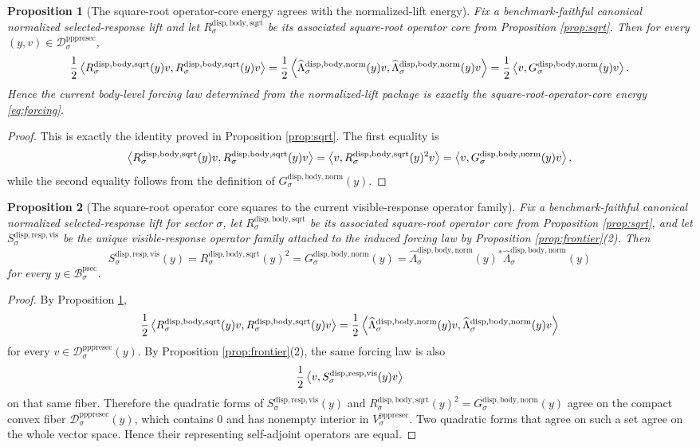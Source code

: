 \documentclass[11pt]{article}
\newcommand{\ProtoSectionBody}[1]{\mathcal B_{#1}^{\mathrm{psec}}}
\newcommand{\PrePreProtoSectionVertical}[1]{V_{#1}^{\mathrm{pppresec}}}
\newcommand{\PrePreProtoSectionResidualBody}[1]{\mathcal D_{#1}^{\mathrm{pppresec}}}
\newcommand{\VisibleResponseOperator}[1]{S_{#1}^{\mathrm{disp,resp,vis}}}
\newcommand{\NormalizedSelectedResponseLift}[1]{\widehat{\Lambda}_{#1}^{\mathrm{disp,body,norm}}}
\newcommand{\SquareRootOperator}[1]{R_{#1}^{\mathrm{disp,body,sqrt}}}
\newcommand{\GramOperator}[1]{G_{#1}^{\mathrm{disp,body,norm}}}
\newtheorem{proposition}{Proposition}
\begin{document}
\begin{proposition}[The square-root operator-core energy agrees with the normalized-lift energy]
\label{prop:energy}
Fix a benchmark-faithful canonical normalized selected-response lift and let \(\SquareRootOperator{\sigma}\) be its associated square-root operator core from Proposition \ref{prop:sqrt}. Then for every \((y,v)\in\PrePreProtoSectionResidualBody{\sigma}\),
\[
\frac{1}{2}
\ev{
\SquareRootOperator{\sigma}(y)v,
\SquareRootOperator{\sigma}(y)v
}
=
\frac{1}{2}
\ev{
\NormalizedSelectedResponseLift{\sigma}(y)v,
\NormalizedSelectedResponseLift{\sigma}(y)v
}
=
\frac{1}{2}
\ev{
v,\GramOperator{\sigma}(y)v
}.
\]
Hence the current body-level forcing law determined from the normalized-lift package is exactly the square-root-operator-core energy \eqref{eq:forcing}.
\end{proposition}

\begin{proof}
This is exactly the identity proved in Proposition \ref{prop:sqrt}. The first equality is
\[
\ev{
\SquareRootOperator{\sigma}(y)v,
\SquareRootOperator{\sigma}(y)v
}
=
\ev{
v,\SquareRootOperator{\sigma}(y)^2v
}
=
\ev{
v,\GramOperator{\sigma}(y)v
},
\]
while the second equality follows from the definition of \(\GramOperator{\sigma}(y)\).
\end{proof}

\begin{proposition}[The square-root operator core squares to the current visible-response operator family]
\label{prop:visible}
Fix a benchmark-faithful canonical normalized selected-response lift for sector \(\sigma\), let \(\SquareRootOperator{\sigma}\) be its associated square-root operator core from Proposition \ref{prop:sqrt}, and let \(\VisibleResponseOperator{\sigma}\) be the unique visible-response operator family attached to the induced forcing law by Proposition \ref{prop:frontier}(2). Then
\[
\VisibleResponseOperator{\sigma}(y)
=
\SquareRootOperator{\sigma}(y)^2
=
\GramOperator{\sigma}(y)
=
\NormalizedSelectedResponseLift{\sigma}(y)^*
\NormalizedSelectedResponseLift{\sigma}(y)
\]
for every \(y\in\ProtoSectionBody{\sigma}\).
\end{proposition}

\begin{proof}
By Proposition \ref{prop:energy},
\[
\frac{1}{2}
\ev{
\SquareRootOperator{\sigma}(y)v,
\SquareRootOperator{\sigma}(y)v
}
=
\frac{1}{2}
\ev{
\NormalizedSelectedResponseLift{\sigma}(y)v,
\NormalizedSelectedResponseLift{\sigma}(y)v
}
\]
for every \(v\in\PrePreProtoSectionResidualBody{\sigma}(y)\). By Proposition \ref{prop:frontier}(2), the same forcing law is also
\[
\frac{1}{2}
\ev{
v,\VisibleResponseOperator{\sigma}(y)v
}
\]
on that same fiber. Therefore the quadratic forms of \(\VisibleResponseOperator{\sigma}(y)\) and \(\SquareRootOperator{\sigma}(y)^2=\GramOperator{\sigma}(y)\) agree on the compact convex fiber \(\PrePreProtoSectionResidualBody{\sigma}(y)\), which contains \(0\) and has nonempty interior in \(\PrePreProtoSectionVertical{\sigma}\). Two quadratic forms that agree on such a set agree on the whole vector space. Hence their representing self-adjoint operators are equal.
\end{proof}
\end{document}
